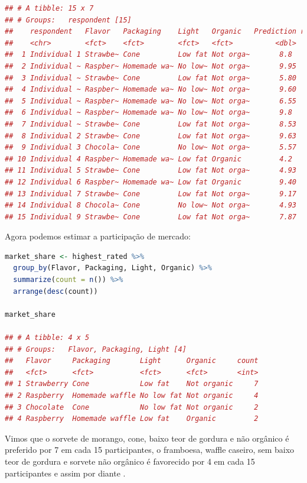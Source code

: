 \documentclass{article}
\begin{document}
\begin{lstlisting}[language=R]
## # A tibble: 15 x 7
## # Groups:   respondent [15]
##    respondent   Flavor   Packaging    Light   Organic   Prediction ranking
##    <chr>        <fct>    <fct>        <fct>   <fct>          <dbl>   <dbl>
##  1 Individual 1 Strawbe~ Cone         Low fat Not orga~       8.8        4
##  2 Individual ~ Raspber~ Homemade wa~ No low~ Not orga~       9.95       4
##  3 Individual ~ Strawbe~ Cone         Low fat Not orga~       5.80       4
##  4 Individual ~ Raspber~ Homemade wa~ No low~ Not orga~       9.60       4
##  5 Individual ~ Raspber~ Homemade wa~ No low~ Not orga~       6.55       4
##  6 Individual ~ Raspber~ Homemade wa~ No low~ Not orga~       9.8        4
##  7 Individual ~ Strawbe~ Cone         Low fat Not orga~       8.53       4
##  8 Individual 2 Strawbe~ Cone         Low fat Not orga~       9.63       4
##  9 Individual 3 Chocola~ Cone         No low~ Not orga~       5.57       4
## 10 Individual 4 Raspber~ Homemade wa~ Low fat Organic         4.2        4
## 11 Individual 5 Strawbe~ Cone         Low fat Not orga~       4.93       4
## 12 Individual 6 Raspber~ Homemade wa~ Low fat Organic         9.40       4
## 13 Individual 7 Strawbe~ Cone         Low fat Not orga~       9.17       4
## 14 Individual 8 Chocola~ Cone         No low~ Not orga~       4.93       4
## 15 Individual 9 Strawbe~ Cone         Low fat Not orga~       7.87       4
\end{lstlisting}



Agora podemos estimar a participação de mercado:

\begin{lstlisting}[language=R]
market_share <- highest_rated %>% 
  group_by(Flavor, Packaging, Light, Organic) %>% 
  summarize(count = n()) %>% 
  arrange(desc(count))

market_share

## # A tibble: 4 x 5
## # Groups:   Flavor, Packaging, Light [4]
##   Flavor     Packaging       Light      Organic     count
##   <fct>      <fct>           <fct>      <fct>       <int>
## 1 Strawberry Cone            Low fat    Not organic     7
## 2 Raspberry  Homemade waffle No low fat Not organic     4
## 3 Chocolate  Cone            No low fat Not organic     2
## 4 Raspberry  Homemade waffle Low fat    Organic         2
\end{lstlisting}


Vimos que o sorvete de morango, cone, baixo teor de gordura e não orgânico é preferido por 7 em cada 15 participantes, o framboesa, waffle caseiro, sem baixo teor de gordura e sorvete não orgânico é favorecido por 4 em cada 15 participantes e assim por diante .
\end{document}
